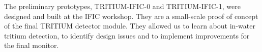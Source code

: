 The preliminary prototypes, TRITIUM-IFIC-0 and TRITIUM-IFIC-1, were designed and built at the IFIC workshop. They are a small-scale proof of concept of the final TRITIUM detector module. They allowed us to learn about in-water tritium detection, to identify design issues and to implement improvements for the final monitor.